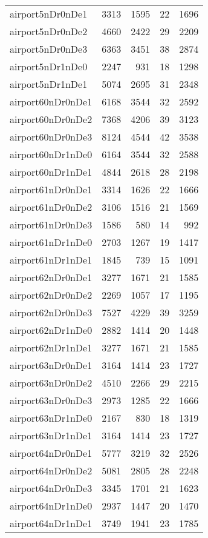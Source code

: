 \begin{longtable}{lrrrr}
airport5nDr0nDe1 & 3313 & 1595 & 22 & 1696 \\
airport5nDr0nDe2 & 4660 & 2422 & 29 & 2209 \\
airport5nDr0nDe3 & 6363 & 3451 & 38 & 2874 \\
airport5nDr1nDe0 & 2247 & 931 & 18 & 1298 \\
airport5nDr1nDe1 & 5074 & 2695 & 31 & 2348 \\
airport60nDr0nDe1 & 6168 & 3544 & 32 & 2592 \\
airport60nDr0nDe2 & 7368 & 4206 & 39 & 3123 \\
airport60nDr0nDe3 & 8124 & 4544 & 42 & 3538 \\
airport60nDr1nDe0 & 6164 & 3544 & 32 & 2588 \\
airport60nDr1nDe1 & 4844 & 2618 & 28 & 2198 \\
airport61nDr0nDe1 & 3314 & 1626 & 22 & 1666 \\
airport61nDr0nDe2 & 3106 & 1516 & 21 & 1569 \\
airport61nDr0nDe3 & 1586 & 580 & 14 & 992 \\
airport61nDr1nDe0 & 2703 & 1267 & 19 & 1417 \\
airport61nDr1nDe1 & 1845 & 739 & 15 & 1091 \\
airport62nDr0nDe1 & 3277 & 1671 & 21 & 1585 \\
airport62nDr0nDe2 & 2269 & 1057 & 17 & 1195 \\
airport62nDr0nDe3 & 7527 & 4229 & 39 & 3259 \\
airport62nDr1nDe0 & 2882 & 1414 & 20 & 1448 \\
airport62nDr1nDe1 & 3277 & 1671 & 21 & 1585 \\
airport63nDr0nDe1 & 3164 & 1414 & 23 & 1727 \\
airport63nDr0nDe2 & 4510 & 2266 & 29 & 2215 \\
airport63nDr0nDe3 & 2973 & 1285 & 22 & 1666 \\
airport63nDr1nDe0 & 2167 & 830 & 18 & 1319 \\
airport63nDr1nDe1 & 3164 & 1414 & 23 & 1727 \\
airport64nDr0nDe1 & 5777 & 3219 & 32 & 2526 \\
airport64nDr0nDe2 & 5081 & 2805 & 28 & 2248 \\
airport64nDr0nDe3 & 3345 & 1701 & 21 & 1623 \\
airport64nDr1nDe0 & 2937 & 1447 & 20 & 1470 \\
airport64nDr1nDe1 & 3749 & 1941 & 23 & 1785 \\

\end{longtable}
